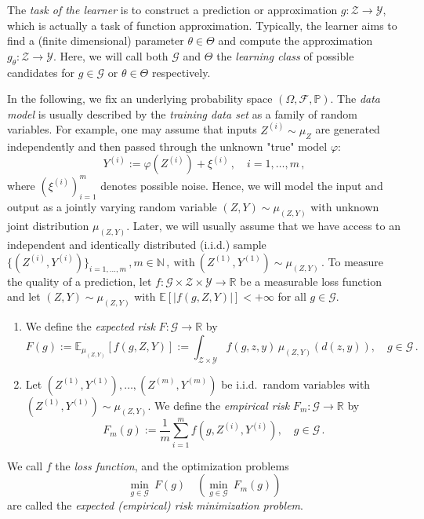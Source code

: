 \documentclass[12pt,openany]{book}
\theoremstyle{definition}
\theoremstyle{definition}
\newcommand{\cF}{\mathcal{F}}
\newcommand{\cG}{\mathcal{G}}
\newcommand{\cY}{\mathcal{Y}}
\newcommand{\cZ}{\mathcal{Z}}
\newcommand{\E}{\mathbb{E}}
\newcommand{\N}{\mathbb{N}}
\newcommand{\R}{\mathbb{R}}
\begin{document}
The \textit{task of the learner} is to construct a prediction or approximation $g:\cZ\to\cY$, which is actually a task of function approximation. Typically, the learner aims to find a (finite dimensional) parameter $\theta\in\Theta$ and compute the approximation $g_\theta:\cZ\to\cY$. Here, we will call both $\cG$ and $\Theta$ the \textit{learning class} of possible candidates for $g\in\cG$ or $\theta\in\Theta$ respectively. 

In the following, we fix an underlying probability space $(\Omega,\cF,\mathbb P)$. The \textit{data model} is usually described by the \textit{training data set} as a family of random variables. For example, one may assume that inputs $Z^{(i)}\sim\mu_Z$ are generated independently and then passed through the unknown "true" model $\varphi$:
\[ Y^{(i)} := \varphi(Z^{(i)}) + \xi^{(i)}\,,\quad i=1,\dots,m\,,\]
where $(\xi^{(i)})_{i=1}^m$ denotes possible noise. Hence, we will model the input and output as a jointly varying random variable $(Z,Y)\sim\mu_{(Z,Y)}$ with unknown joint distribution $\mu_{(Z,Y)}$. Later, we will usually assume that we have access to an independent and identically distributed (i.i.d.) sample 
$\{(Z^{(i)},Y^{(i)})\}_{i=1,\dots,m}\,, m\in\N\,, \ \text{with}\ (Z^{(1)},Y^{(1)})\sim\mu_{(Z,Y)}\,.$ To measure the quality of a prediction, let $f:\cG\times \cZ \times \cY\to\R$ be a measurable loss function and let $(Z,Y)\sim\mu_{(Z,Y)}$ with $\E[|f(g,Z,Y)|]<+\infty$ for all $g\in\cG$. 
    \begin{enumerate}
        \item[(i)] We define the \textit{expected risk} $F:\cG\to\R$ by
        \[F(g):=\E_{\mu_{(Z,Y)}}[f(g,Z,Y)]:=\int_{\cZ\times\cY} f(g,z,y)\, \mu_{(Z,Y)}(d(z,y)),\quad g\in\cG\,. \]
        \item[(ii)] Let $(Z^{(1)},Y^{(1)}),\dots,(Z^{(m)},Y^{(m)})$ be i.i.d.~random variables with $(Z^{(1)},Y^{(1)})\sim\mu_{(Z,Y)}$. We define the \textit{empirical risk} $F_m:\cG\to\R$ by
        \[F_m(g):= \frac1m\sum_{i=1}^m f(g,Z^{(i)},Y^{(i)}),\quad g\in\cG\,.\]
    \end{enumerate}
    We call $f$ the \textit{loss function}, and the optimization problems
    \[\min_{g\in\cG}\ F(g) \quad (\min_{g\in\cG}\ F_m(g))\]
    are called the \textit{expected (empirical) risk minimization problem}.
\end{document}
